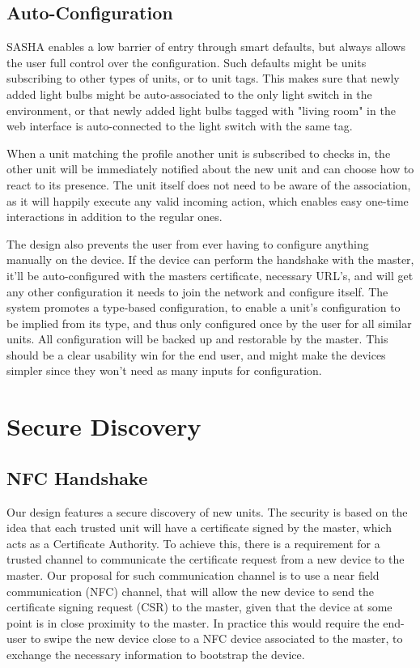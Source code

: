 \subsection{Auto-Configuration}
SASHA enables a low barrier of entry through smart defaults, but always allows the user full control over the configuration. Such defaults might be units subscribing to other types of units, or to unit tags. This makes sure that newly added light bulbs might be auto-associated to the only light switch in the environment, or that newly added light bulbs tagged with "living room" in the web interface is auto-connected to the light switch with the same tag.

When a unit matching the profile another unit is subscribed to checks in, the other unit will be immediately notified about the new unit and can choose how to react to its presence. The unit itself does not need to be aware of the association, as it will happily execute any valid incoming action, which enables easy one-time interactions in addition to the regular ones.

The design also prevents the user from ever having to configure anything manually on the device. If the device can perform the handshake with the master, it'll be auto-configured with the masters certificate, necessary URL’s, and will get any other configuration it needs to join the network and configure itself. The system promotes a type-based configuration, to enable a unit's configuration to be implied from its type, and thus only configured once by the user for all similar units. All configuration will be backed up and restorable by the master. This should be a clear usability win for the end user, and might make the devices simpler since they won't need as many inputs for configuration.


\section{Secure Discovery}
\subsection{NFC Handshake}
Our design features a secure discovery of new units. The security is based on the idea that each trusted unit will have a certificate signed by the master, which acts as a Certificate Authority. To achieve this, there is a requirement for a trusted channel to communicate the certificate request from a new device to the master. Our proposal for such communication channel is to use a near field communication (NFC) channel, that will allow the new device to send the certificate signing request (CSR) to the master, given that the device at some point is in close proximity to the master. In practice this would require the end-user to swipe the new device close to a NFC device associated to the master, to exchange the necessary information to bootstrap the device.

